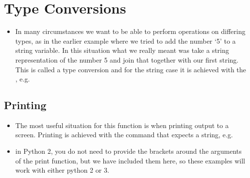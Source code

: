 \documentclass[letterpaper,10pt,english,openany]{sphinxmanual}
\begin{document}


\section{Type Conversions}
\label{\detokenize{introduction_to_python/type_conversions:type-conversions}}\label{\detokenize{introduction_to_python/type_conversions:id1}}\label{\detokenize{introduction_to_python/type_conversions::doc}}\begin{itemize}
\item {} 
In many circumstances we want to be able to perform operations on
differing types, as in the earlier example where we tried to add the
number ‘5’ to a string variable. In this situation what we really
meant was take a string representation of the number 5 and join that
together with our first string. This is called a type conversion and
for the string case it is achieved with the , e.g.

\end{itemize}

\begin{sphinxVerbatim}[commandchars=\\\{\}]
  
  
      
\end{sphinxVerbatim}


\subsection{Printing}
\label{\detokenize{introduction_to_python/type_conversions:printing}}\begin{itemize}
\item {} 
The most useful situation for this function is when printing output
to a screen. Printing is achieved with the  command that
expects a string, e.g.

\item {} 
in Python 2, you do not need to provide the brackets around the
arguments of the print function, but we have included them here, so
these examples will work with either python 2 or 3.

\end{itemize}
\end{document}
